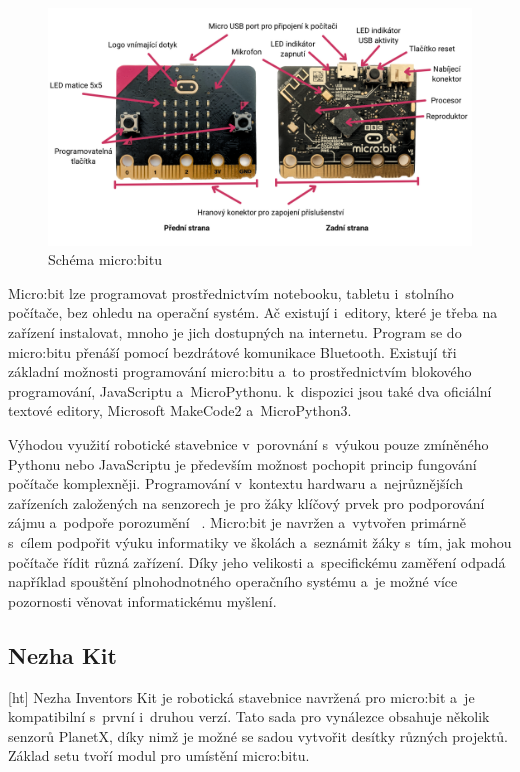 \documentclass[
  digital,     %
  oneside,     %
  nosansbold,  %
  colorbold, %
  lof,         %
  nolot,         %
]{fithesis4}
\begin{document}
\begin{figure}
    \centering
    \includegraphics[width=\textwidth] {images/microbit.png}
    \caption{Schéma micro:bitu}
    \label{microbit}
\end{figure}

Micro:bit lze programovat prostřednictvím notebooku, tabletu i~stolního počítače, bez ohledu na operační systém. Ač existují i~editory, které je třeba na zařízení instalovat, mnoho je jich dostupných na internetu. Program se do micro:bitu přenáší pomocí bezdrátové komunikace Bluetooth. Existují tři základní možnosti programování micro:bitu a~to prostřednictvím blokového programování, JavaScriptu a~MicroPythonu. k~dispozici jsou také dva oficiální textové editory, Microsoft MakeCode2 a~MicroPython3.

Výhodou využití robotické stavebnice v~porovnání s~výukou pouze zmíněného Pythonu nebo JavaScriptu je především možnost pochopit princip fungování počítače komplexněji. Programování v~kontextu hardwaru a~nejrůznějších zařízeních založených na senzorech je pro žáky klíčový prvek pro podporování zájmu a~podpoře porozumění ~\cite{Sentance17}. Micro:bit je navržen a~vytvořen primárně s~cílem podpořit výuku informatiky ve školách a~seznámit žáky s~tím, jak mohou počítače řídit různá zařízení. Díky jeho velikosti a~specifickému zaměření odpadá například spouštění plnohodnotného operačního systému a~je možné více pozornosti věnovat informatickému myšlení.

\subsection{Nezha Kit}[ht]
Nezha Inventors Kit je robotická stavebnice navržená pro micro:bit a~je kompatibilní s~první i~druhou verzí. Tato sada pro vynálezce obsahuje několik senzorů PlanetX, díky nimž je možné se sadou vytvořit desítky různých projektů. Základ setu tvoří modul pro umístění micro:bitu. 
\end{document}
